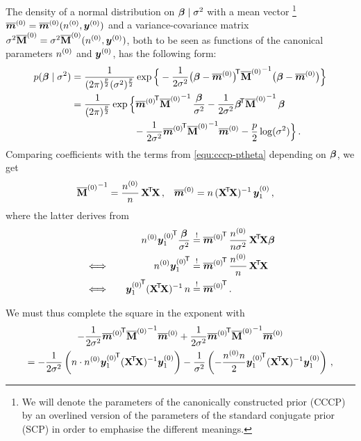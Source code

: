 The density of a normal distribution on $\boldsymbol{\beta}\mid\sigma^2$ with a mean vector%
\footnote{We will denote the parameters of the canonically constructed prior (CCCP)
by an overlined version of the parameters of the standard conjugate prior (SCP)
in order to emphasise the different meanings.}
$\overline{{\bm m}}^{(0)} = \overline{{\bm m}}^{(0)}(n^{(0)},{\bm y}^{(0)})$ and a variance-covariance matrix $\sigma^2 \overline{\mathbf{M}}^{(0)} = \sigma^2 \overline{\mathbf{M}}^{(0)}(n^{(0)},{\bm y}^{(0)})$,
both to be seen as functions of the canonical parameters $n^{(0)}$ and ${\bm y}^{(0)}$,
has the following form:
\begin{align*}
p(\bbeta\mid\sigma^2) &= \frac{1}{(2\pi)^{\frac{p}{2}} (\sigma^2)^{\frac{p}{2}}}
                         \exp \Big\{ -\frac{1}{2 \sigma^2} \big(\bbeta - \tmz\big)^\tra {\tMz}^{-1}
                                                           \big(\bbeta - \tmz\big) \Big\}\\
                      &= \frac{1}{(2\pi)^{\frac{p}{2}}}
                         \exp\Big\{ {\tmz}^\tra {\tMz}^{-1} \,\frac{\bbeta}{\sigma^2}
                                   -\frac{1}{2\sigma^2} \bbeta^\tra {\tMz}^{-1}\, \bbeta \\ & \hspace*{15ex}
                                   -\frac{1}{2\sigma^2} {\tmz}^\tra {\tMz}^{-1} \tmz
                                   -\frac{p}{2} \log(\sigma^2)\Big\}\,.
\end{align*}
Comparing coefficients with the terms from \eqref{equ:cccp-ptheta} depending on $\boldsymbol{\beta}$, we get
\begin{align*}
{\tMz}^{-1} &= %
               \frac{\nz}{n}\, \XtX\,, &
       \tmz &= %
               n\, (\XtX)^{-1}\, \byz_1\,,
\end{align*}
where the latter derives from
\begin{alignat*}{2}
& &
\nz {\byz_1}^\tra \frac{\bbeta}{\sigma^2} &\stackrel{!}{=} {\tmz}^\tra\, \frac{\nz}{n\sigma^2}\, \XtX \bbeta \\
&\Longleftrightarrow\quad &
\nz {\byz_1}^\tra                         &\stackrel{!}{=} {\tmz}^\tra\, \frac{\nz}{n}\, \XtX \\
&\Longleftrightarrow\quad &
{\byz_1}^\tra (\XtX)^{-1}\, n             &\stackrel{!}{=} {\tmz}^\tra\,.
\end{alignat*}

We must thus complete the square in the exponent with
\begin{multline*}
    -\frac{1}{2\sigma^2} {\tmz}^\tra {\tMz}^{-1} \tmz
    +\frac{1}{2\sigma^2} {\tmz}^\tra {\tMz}^{-1} \tmz \\
  = -\frac{1}{2\sigma^2}\left( n \cdot \nz {\byz_1}^\tra (\XtX)^{-1} \byz_1 \right)
    -\frac{1}{\sigma^2} \left(-\frac{\nz n}{2} {\byz_1}^\tra (\XtX)^{-1} \byz_1 \right)\,,
\end{multline*}


